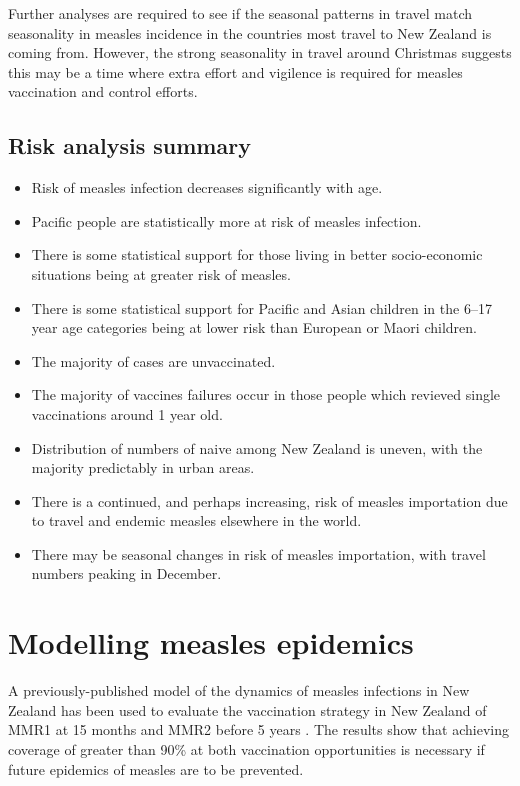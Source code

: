\documentclass{article}
\begin{document}
Further analyses are required to see if the seasonal patterns in travel match seasonality in measles incidence in the countries most travel to New Zealand is coming from. However, the strong seasonality in travel around Christmas suggests this may be a time where extra effort and vigilence is required for measles vaccination and control efforts.

\subsection{Risk analysis summary}
\begin{itemize}
\item Risk of measles infection decreases significantly with age.
\item Pacific people are statistically more at risk of measles infection.
\item There is some statistical support for those living in better socio-economic situations being at greater risk of measles.
\item There is some statistical support for Pacific and Asian children in the 6--17 year age categories being at lower risk than European or Maori children.
\item The majority of cases are unvaccinated.
\item The majority of vaccines failures occur in those people which revieved single vaccinations around 1 year old.
\item Distribution of numbers of naive among New Zealand is uneven, with the majority predictably in urban areas.
\item There is a continued, and perhaps increasing, risk of measles importation due to travel and endemic measles elsewhere in the world.
\item There may be seasonal changes in risk of measles importation, with travel numbers peaking in December.
\end{itemize}

\section{Modelling measles epidemics}
\label{sec:epidemic_modelling}

A previously-published model of the dynamics of measles infections in New Zealand has been used to evaluate the vaccination strategy in New Zealand of MMR1 at 15 months and MMR2 before 5 years \citep{roberts0,roberts4,tobias98}. The results show that achieving coverage of greater than 90\% at both vaccination opportunities is necessary if future epidemics of measles are to be prevented.
\end{document}
